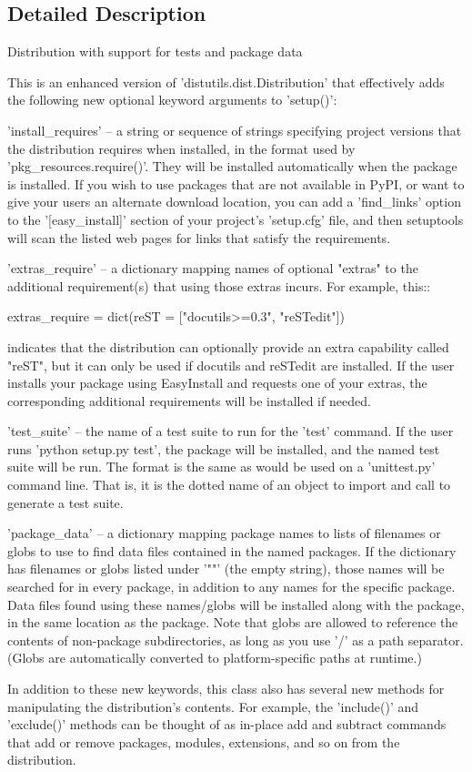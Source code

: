 \subsection{Detailed Description}
\begin{DoxyVerb}Distribution with support for tests and package data

This is an enhanced version of 'distutils.dist.Distribution' that
effectively adds the following new optional keyword arguments to 'setup()':

 'install_requires' -- a string or sequence of strings specifying project
    versions that the distribution requires when installed, in the format
    used by 'pkg_resources.require()'.  They will be installed
    automatically when the package is installed.  If you wish to use
    packages that are not available in PyPI, or want to give your users an
    alternate download location, you can add a 'find_links' option to the
    '[easy_install]' section of your project's 'setup.cfg' file, and then
    setuptools will scan the listed web pages for links that satisfy the
    requirements.

 'extras_require' -- a dictionary mapping names of optional "extras" to the
    additional requirement(s) that using those extras incurs. For example,
    this::

        extras_require = dict(reST = ["docutils>=0.3", "reSTedit"])

    indicates that the distribution can optionally provide an extra
    capability called "reST", but it can only be used if docutils and
    reSTedit are installed.  If the user installs your package using
    EasyInstall and requests one of your extras, the corresponding
    additional requirements will be installed if needed.

 'test_suite' -- the name of a test suite to run for the 'test' command.
    If the user runs 'python setup.py test', the package will be installed,
    and the named test suite will be run.  The format is the same as
    would be used on a 'unittest.py' command line.  That is, it is the
    dotted name of an object to import and call to generate a test suite.

 'package_data' -- a dictionary mapping package names to lists of filenames
    or globs to use to find data files contained in the named packages.
    If the dictionary has filenames or globs listed under '""' (the empty
    string), those names will be searched for in every package, in addition
    to any names for the specific package.  Data files found using these
    names/globs will be installed along with the package, in the same
    location as the package.  Note that globs are allowed to reference
    the contents of non-package subdirectories, as long as you use '/' as
    a path separator.  (Globs are automatically converted to
    platform-specific paths at runtime.)

In addition to these new keywords, this class also has several new methods
for manipulating the distribution's contents.  For example, the 'include()'
and 'exclude()' methods can be thought of as in-place add and subtract
commands that add or remove packages, modules, extensions, and so on from
the distribution.
\end{DoxyVerb}
 

